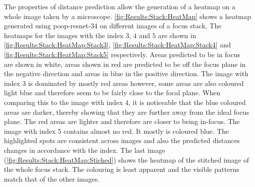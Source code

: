 The properties of distance prediction allow the generation of a heatmap on a whole image taken by a microscope. \autoref{fig:Results:Stack:HeatMap} shows a heatmap generated using \acs{poop}-\acs{resnet}-34 on different images of a focus stack. The heatmaps for the images with the index $3$, $4$ and $5$ are shown in \autoref{fig:Results:Stack:HeatMap:Stack3}, \autoref{fig:Results:Stack:HeatMap:Stack4} and \autoref{fig:Results:Stack:HeatMap:Stack5} respectively. Areas predicted to be in focus are shown in white, areas shown in red are predicted to be off the focus plane in the negative direction and areas in blue in the positive direction. The image with index 3 is dominated by mostly red areas however, some areas are also coloured light blue and therefore seem to be fairly close to the focal plane. When comparing this to the image with index 4, it is noticeable that the blue coloured areas are darker, thereby showing that they are further away from the ideal focus plane. The red areas are lighter and therefore are closer to being in-focus. The image with index 5 contains almost no red. It mostly is coloured blue. The highlighted spots are consistent across images and also the predicted distances changes in accordance with the index. The last image (\autoref{fig:Results:Stack:HeatMap:Stiched}) shows the heatmap of the stitched image of the whole focus stack. The colouring is least apparent and the visible patterns match that of the other images.


